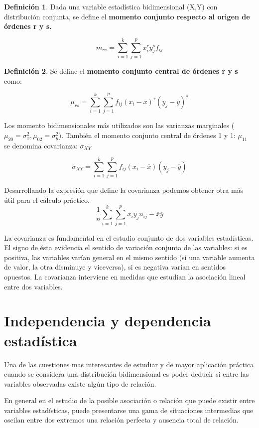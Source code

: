 \documentclass{article}
\theoremstyle{definition}
\newtheorem{definition}{Definición}[section]
\begin{document}
\begin{definition}
Dada una variable estadística bidimensional (X,Y) con distribución conjunta, se
define el \textbf{momento conjunto respecto al origen de órdenes r y s.}

$$ m_{rs} = \sum_{i=1}^k \sum_{j=1}^p x_i^r y_j^s f_{ij}$$
\end{definition}

\begin{definition}
Se define el \textbf{momento conjunto central de órdenes r y s} como:

	$$
	\mu_{rs} = \sum_{i=1}^k \sum_{j=1}^p f_{ij}
			{(x_i - \overline{x})}^r {(y_j - \overline{y})}^s
	$$
\end{definition}

	Los momento bidimensionales más utilizados son las varianzas marginales
	{($\mu_{20}=\sigma_x^2, \mu_{02}=\sigma_y^2$)}. También el momento conjunto
	central de órdenes 1 y 1: $\mu_{11}$ se denomina covarianza: $\sigma_{XY}$

	$$\sigma_{XY} = \sum_{i=1}^k \sum_{j=1}^p f_{ij} {(x_i - \overline{x} )}( y_j -
	\overline{y} )$$

	Desarrollando la expresión que define la covarianza podemos obtener otra más
	útil para el cálculo práctico.  $$ \frac{1}{n} \sum_{i=1}^k \sum_{j=1}^p x_i
	y_j n_{ij} - \overline{x} \overline{y} $$

	La covarianza es fundamental en el estudio conjunto de dos variables
	estadísticas. El signo de ésta evidencia el sentido de variación conjunta de
	las variables: si es positiva, las variables varían general en el mismo
	sentido (si una variable aumenta de valor, la otra disminuye y viceversa), si
	es negativa varían en sentidos opuestos. La covarianza interviene en medidas
	que estudian la asociación lineal entre dos variables.

	\section{Independencia y dependencia estadística}

 Una de las cuestiones mas interesantes de estudiar y de mayor aplicación
 práctica cuando se considera una distribución bidimensional es poder deducir si
 entre las variables observadas existe algún tipo de relación.

 En general en el estudio de la posible asociación o relación que puede existir
 entre variables estadísticas, puede presentarse una gama de situaciones
 intermedias que oscilan entre dos extremos una relación perfecta y ausencia
 total de relación.
\end{document}
